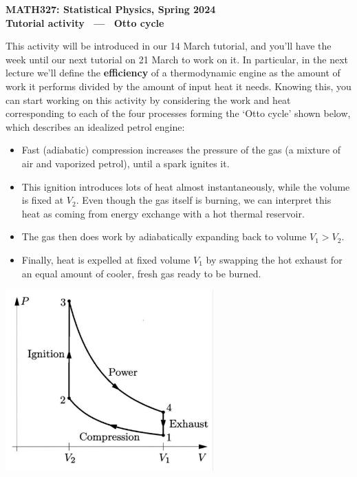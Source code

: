 \documentclass[12 pt]{article} %
\begin{document}
\newcommand{\thisunit}{MATH327 Tutorial (Cycle)}
\newcommand{\moddate}{Last modified 14 Mar.~2024}
\begin{center}
  {\Large \textbf{MATH327: Statistical Physics, Spring 2024}} \\[12 pt]
  {\Large \textbf{Tutorial activity \ --- \ Otto cycle}} \\[24 pt]
\end{center}

This activity will be introduced in our 14 March tutorial, and you'll have the week until our next tutorial on 21 March to work on it.
In particular, in the next lecture we'll define the \textbf{efficiency} of a thermodynamic engine as the amount of work it performs divided by the amount of input heat it needs.
Knowing this, you can start working on this activity by considering the work and heat corresponding to each of the four processes forming the `Otto cycle' shown below, which describes an idealized petrol engine: \\[-24 pt]
\begin{itemize}
  \item Fast (adiabatic) compression increases the pressure of the gas (a mixture of air and vaporized petrol), until a spark ignites it.
  \item This ignition introduces lots of heat almost instantaneously, while the volume is fixed at $V_2$.
        Even though the gas itself is burning, we can interpret this heat as coming from energy exchange with a hot thermal reservoir.
  \item The gas then does work by adiabatically expanding back to volume $V_1 > V_2$.
  \item Finally, heat is expelled at fixed volume $V_1$ by swapping the hot exhaust for an equal amount of cooler, fresh gas ready to be burned.
\end{itemize}

\begin{center}\includegraphics[width=0.6\textwidth]{figs/Otto.pdf}\end{center}
\end{document}
